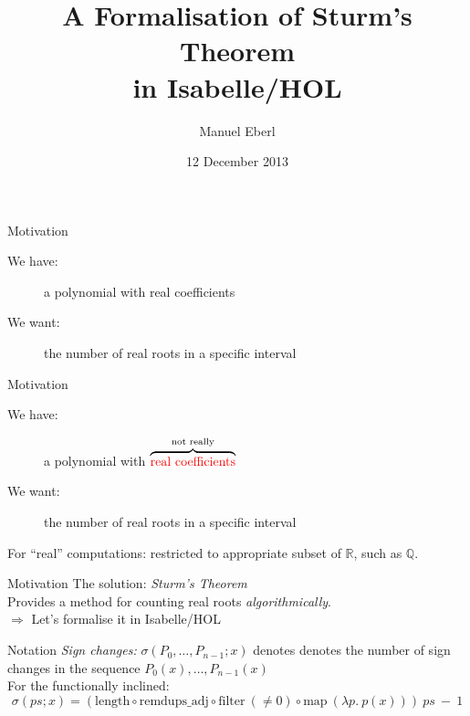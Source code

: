 \documentclass[%
	sans,			%
	mathsans,		%
	10pt,
	t		%
	slidescentered,%
]{beamer}
\title[asdf]{A Formalisation of Sturm's Theorem\\in Isabelle/HOL}
\subtitle{}
\author{Manuel Eberl}
\date{12 December 2013} %
\newcommand{\RR}{\mathbb{R}}
\newcommand{\QQ}{\mathbb{Q}}
\begin{document}
\AddToShipoutPicture{\TitlePicture}
\maketitle
\ClearShipoutPicture
\AddToShipoutPicture{\BackgroundPicture}

\begin{frame}{Motivation}
\begin{description}
\item[We have:] a polynomial with real coefficients
\pause\item[We want:] the number of real roots in a specific interval
\end{description}
\end{frame}

\begin{frame}{Motivation}
\vspace*{1.65mm}
\begin{description}
\item[We have:] a polynomial with $\overbrace{\text{\color{red}real\ coefficients}}^{\text{not\ really}}$
\vspace*{-0.05mm}
\item[We want:] the number of real roots in a specific interval
\end{description}
\vspace{5mm}
\pause
For \enquote{real} computations: restricted to appropriate subset of $\RR$, such as $\QQ$.
\end{frame}

\begin{frame}{Motivation}
The solution: \emph{Sturm's Theorem}\\[2mm]

Provides a method for counting real roots \emph{algorithmically}.\\[10mm]

$\Longrightarrow$ Let's formalise it in Isabelle/HOL
\end{frame}

\begin{frame}{Notation}
\emph{Sign changes:} $\sigma(P_0,\ldots,P_{n-1}; x)$ denotes denotes the number of sign changes in the sequence $P_0(x), \ldots, P_{n-1}(x)$\\[2mm]
For the functionally inclined:\vskip-6mm
$$\sigma(ps; x) = (\mathrm{length} \circ \mathrm{remdups\_adj} \circ \mathrm{filter}\ (\neq 0) \circ \mathrm{map}\ (\lambda p.\ p(x)))\ ps\ -\ 1$$
\end{frame}
\end{document}
